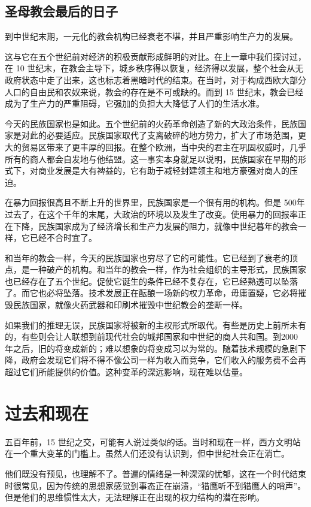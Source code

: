 \subsection{圣母教会最后的日子}
到中世纪末期，一元化的教会机构已经衰老不堪，并且严重影响生产力的发展。

这与它在五个世纪前对经济的积极贡献形成鲜明的对比。在上一章中我们探讨过，在 10 世纪末，在教会主导下，城乡秩序得以恢复，经济得以发展，整个社会从无政府状态中走了出来，这也标志着黑暗时代的结束。在当时，对于构成西欧大部分人口的自由民和农奴来说，教会的存在是不可或缺的。而到 15 世纪末，教会已经成为了生产力的严重阻碍，它强加的负担大大降低了人们的生活水准。

今天的民族国家也是如此。五个世纪前的火药革命创造了新的大政治条件，民族国家是对此的必要适应。民族国家取代了支离破碎的地方势力，扩大了市场范围，更大的贸易区带来了更丰厚的回报。在整个欧洲，当中央的君主在巩固权威时，几乎所有的商人都会自发地与他结盟。这一事实本身就足以说明，民族国家在早期的形式下，对商业发展是大有裨益的，它有助于减轻封建领主和地方豪强对商人的压迫。

在暴力回报很高且不断上升的世界里，民族国家是一个很有用的机构。但是 500年过去了，在这个千年的末尾，大政治的环境以及发生了改变。使用暴力的回报率正在下降，民族国家成为了经济增长和生产力发展的阻力，就像中世纪暮年的教会一样，它已经不合时宜了。

和当年的教会一样，今天的民族国家也穷尽了它的可能性。它已经到了衰老的顶点，是一种破产的机构。和当年的教会一样，作为社会组织的主导形式，民族国家也已经存在了五个世纪。促使它诞生的条件已经不复存在，它已经熟透可以坠落了。而它也必将坠落。技术发展正在酝酿一场新的权力革命，毋庸置疑，它必将摧毁民族国家，就像火药武器和印刷术摧毁中世纪教会的垄断一样。

如果我们的推理无误，民族国家将被新的主权形式所取代。有些是历史上前所未有的，有些则会让人联想到前现代社会的城邦国家和中世纪的商人共和国。到2000 年之后，旧的将变成新的；难以想象的将变成习以为常的。随着技术规模的急剧下降，政府会发现它们将不得不像公司一样为收入而竞争，它们收入的服务费不会再超过它们所能提供的价值。这种变革的深远影响，现在难以估量。

\section{过去和现在}
五百年前，15 世纪之交，可能有人说过类似的话。当时和现在一样，西方文明站在一个重大变革的门槛上。虽然人们还没有认识到，但中世纪社会正在消亡。

他们既没有预见，也理解不了。普遍的情绪是一种深深的忧郁，这在一个时代结束时很常见，因为传统的思想家感觉到事态正在崩溃，“猎鹰听不到猎鹰人的哨声”。但是他们的思维惯性太大，无法理解正在出现的权力结构的潜在影响。

